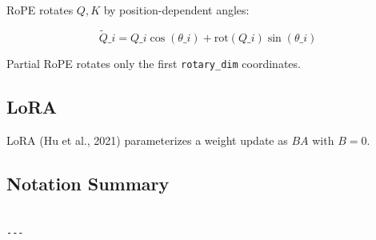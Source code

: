 RoPE rotates $Q, K$ by position-dependent angles:

\[
\tilde{Q}\_i = Q\_i \cos(\theta\_i) + \text{rot}(Q\_i) \sin(\theta\_i)
\tag{3.8}
\]

Partial RoPE rotates only the first \texttt{rotary\_dim} coordinates.

\subsection{LoRA}

LoRA (Hu et al., 2021) parameterizes a weight update as $BA$ with $B = 0$.

\subsection{Notation Summary}

\begin{lstlisting}

---
\end{lstlisting}
